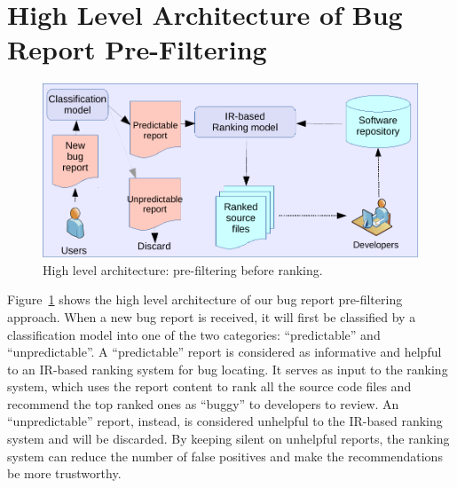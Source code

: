 \section{High Level Architecture of Bug Report Pre-Filtering}
\label{sec:high level architecture}
\begin{figure}[t]
\centering
\includegraphics[width=\columnwidth]{figures/prefiltering.pdf}
\caption{High level architecture: pre-filtering before ranking.}
\label{fig:prefiltering architecture}
\end{figure}
Figure~\ref{fig:prefiltering architecture} shows the high level architecture of our bug report pre-filtering approach. When a new bug report is received, it will first be classified by a classification model into one of the two categories: ``predictable'' and ``unpredictable''. A ``predictable'' report is considered as informative and helpful to an IR-based ranking system for bug locating. It serves as input to the ranking system, which uses the report content to rank all the source code files and recommend the top ranked ones as ``buggy'' to developers to review. An ``unpredictable'' report, instead, is considered unhelpful to the IR-based ranking system and will be discarded. By keeping silent on unhelpful reports, the ranking system can reduce the number of false positives and make the recommendations be more trustworthy.


